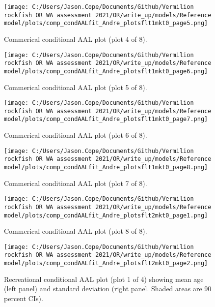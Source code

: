 \documentclass[11pt,
  english,
  letterpaper,
]{article}
\begin{document}
\begin{figure}
\centering
\texttt{[image: C:/Users/Jason.Cope/Documents/Github/Vermilion rockfish OR WA assessment 2021/OR/write\_up/models/Reference model/plots/comp\_condAALfit\_Andre\_plotsflt1mkt0\_page5.png]}
\caption{Commerical conditional AAL plot (plot 4 of 8).\label{fig:comp_condAALfit_Andre_plotsflt1mkt0_page5}}
\end{figure}

\begin{figure}
\centering
\texttt{[image: C:/Users/Jason.Cope/Documents/Github/Vermilion rockfish OR WA assessment 2021/OR/write\_up/models/Reference model/plots/comp\_condAALfit\_Andre\_plotsflt1mkt0\_page6.png]}
\caption{Commerical conditional AAL plot (plot 5 of 8).\label{fig:comp_condAALfit_Andre_plotsflt1mkt0_page6}}
\end{figure}

\begin{figure}
\centering
\texttt{[image: C:/Users/Jason.Cope/Documents/Github/Vermilion rockfish OR WA assessment 2021/OR/write\_up/models/Reference model/plots/comp\_condAALfit\_Andre\_plotsflt1mkt0\_page7.png]}
\caption{Commerical conditional AAL plot (plot 6 of 8).\label{fig:comp_condAALfit_Andre_plotsflt1mkt0_page7}}
\end{figure}

\begin{figure}
\centering
\texttt{[image: C:/Users/Jason.Cope/Documents/Github/Vermilion rockfish OR WA assessment 2021/OR/write\_up/models/Reference model/plots/comp\_condAALfit\_Andre\_plotsflt1mkt0\_page8.png]}
\caption{Commerical conditional AAL plot (plot 7 of 8).\label{fig:comp_condAALfit_Andre_plotsflt1mkt0_page8}}
\end{figure}

\begin{figure}
\centering
\texttt{[image: C:/Users/Jason.Cope/Documents/Github/Vermilion rockfish OR WA assessment 2021/OR/write\_up/models/Reference model/plots/comp\_condAALfit\_Andre\_plotsflt2mkt0\_page1.png]}
\caption{Commerical conditional AAL plot (plot 8 of 8).\label{fig:comp_condAALfit_Andre_plotsflt2mkt0_page1}}
\end{figure}

\begin{figure}
\centering
\texttt{[image: C:/Users/Jason.Cope/Documents/Github/Vermilion rockfish OR WA assessment 2021/OR/write\_up/models/Reference model/plots/comp\_condAALfit\_Andre\_plotsflt2mkt0\_page2.png]}
\caption{Recreational conditional AAL plot (plot 1 of 4) showing mean age (left panel) and standard deviation (right panel. Shaded areas are 90 percent CIs).\label{fig:comp_condAALfit_Andre_plotsflt2mkt0_page2}}
\end{figure}
\end{document}
